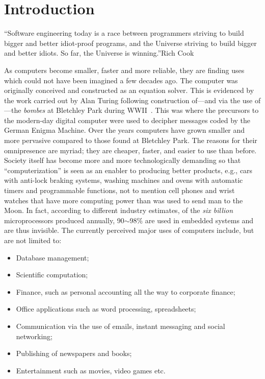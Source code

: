 \chapter{Introduction}{``Software engineering today is a race between
  programmers striving to build bigger and better idiot-proof
  programs, and the Universe striving to build bigger and better
  idiots. So far, the Universe is winning.''}{Rich Cook}

As computers become smaller, faster and more reliable, they are
finding uses which could not have been imagined a few decades ago. The
computer was originally conceived and constructed as an equation
solver. This is evidenced by the work carried out by Alan Turing
following construction of---and via the use of---the \emph{bombes} at
Bletchley Park during WWII~\cite{codebook}. This was where the
precursors to the modern-day digital computer were used to decipher
messages coded by the German Enigma Machine. Over the years computers
have grown smaller and more pervasive compared to those found at
Bletchley Park. The reasons for their omnipresence are myriad; they
are cheaper, faster, and easier to use than before. Society itself has
become more and more technologically demanding so that
``computerization'' is seen as an enabler to producing better
products, e.g., cars with anti-lock braking systems, washing machines
and ovens with automatic timers and programmable functions, not to
mention cell phones and wrist watches that have more computing power
than was used to send man to the Moon. In fact, according to different
industry estimates, of the \emph{six billion} microprocessors produced
annually, 90$\sim$98\% are used in embedded systems and are thus
invisible. The currently perceived major uses of computers include,
but are not limited to:\\

\begin{itemize}
\item{Database management;}
\item{Scientific computation;}
\item{Finance, such as personal accounting all the way to corporate
  finance;}
\item{Office applications such as word processing, spreadsheets;}
\item{Communication via the use of emails, instant messaging and
  social networking;}
\item{Publishing of newspapers and books;}
\item{Entertainment such as movies, video games etc.}
\end{itemize}

